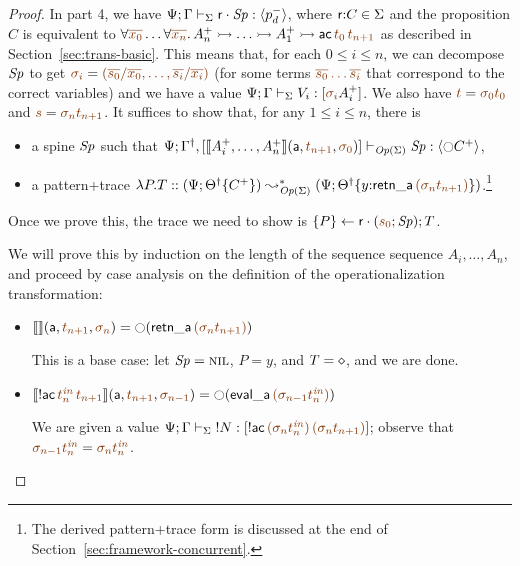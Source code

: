 \begin{proof}
In part 4, we have ${\Psi}; {\Gamma} \vdash_{\Sigma} {{\sf
    r} \cdot {{\it Sp}}} : {\langle {p^-_d} \rangle}$, where ${\sf r}{:}C \in \Sigma$ and the
proposition $C$ is equivalent to
$\forall\lf{\overline{x_0}}\ldots\forall\lf{\overline{x_n}}.\, A^+_n \lefti
\ldots \lefti A^+_1 \lefti {\sf ac}\,\lf{t_0}\,\lf{t_{n+1}}$ as described in
Section~\ref{sec:trans-basic}. This means that, for each $0 \leq
i \leq n$, we can decompose ${\it Sp}$ to
get $\lf{\sigma_i} = \lf{(\overline{s_0}/\overline{x_0},\ldots,
\overline{s_i}/\overline{x_i})}$ (for some terms $\lf{\overline{s_0} \ldots
\overline{s_i}}$ that correspond to the correct variables) and 
we have a value
$\slst{\Sigma}{\Psi}{\Gamma}{V_i}{[\lf{\sigma_i}{A^+_i}]}$. 
We also have $\lf{t} = \lf{\sigma_0{t_0}}$ and $\lf{s} = \lf{\sigma_n{t_{n+1}}}$.
It suffices to show that, for any $1 \leq i \leq n$, 
there is
\smallskip
\begin{itemize}
\item a spine ${\it Sp}$ such that 
$\slst{\transop\Sigma}{\Psi}{\opsubst{\Gamma},[
\opbasic{A_i^+, \ldots, A_n^+}{t_{n+1}}{\sigma_0}
]}{\Sp}{\susp{{\ocircle}C^+}}$,
\item a pattern+trace $\lambda P.T :: (\Psi; \tackon{\opsubst{\Theta}}{C^+}) 
\leadsto^*_{\transop{\Sigma}}
 (\Psi; \tackon{\opsubst{\Theta}}{y{:}{\sf retn\_a}\,\lf{({\sigma_n}t_{n+1})}})$.\footnote{The derived pattern+trace form is discussed at the end of Section~\ref{sec:framework-concurrent}.}
\end{itemize}
\smallskip
Once we prove this, the trace we need to show is $\tstep{P}{\sf r}{(\lf{s_0};\Sp)}; T$.

We will prove this
by induction on the length of the sequence sequence $A_i,\ldots,A_n$, and
proceed
by case analysis on the definition of the operationalization transformation:
\begin{itemize}
\item $\opbasic{}{t_{n+1}}{\sigma_n} = {\ocircle}({\sf retn\_a}\,\lf{(\sigma_{n}{t_{n+1}})})$

  \bigskip
  This is a base case: 
  let ${\it Sp} = \textsc{nil}$, $P = y$, and $T = \diamond$, and 
  we are done.
  \bigskip

\item $\opbasic{{!}{\sf ac}\,\lf{t^{\it in}_n}\,\lf{t_{n+1}}}{t_{n+1}}{\lf{\sigma_{n-1}}} 
  = {\ocircle}({\sf eval\_a}\,\lf{(\sigma_{n-1}{t^{\it in}_n})})$

  \bigskip
  We are given a value 
  $\slst{\Sigma}{\Psi}{\Gamma}{\tbangr{N}}
   {[{\bang}{\sf ac}\,\lf{(\sigma_n{t^{\it in}_n})}\,\lf{(\sigma_n{t_{n+1}})}]}$;
  observe that $\lf{\sigma_{n-1}{t_n^{\it in}}} = \lf{\sigma_n{t_n^{\it in}}}$.


\end{itemize}
\end{proof}
